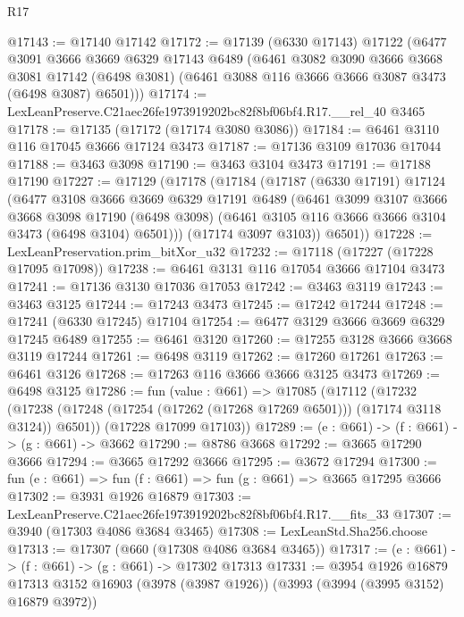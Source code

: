 \begin{lexlean}{R17}
\begin{coremodule}
@17143 := @17140 @17142
@17172 := @17139
    (@6330 @17143)
    @17122
    (@6477
      @3091
      @3666
      @3669
      @6329
      @17143
      @6489
      (@6461
        @3082
        @3090
        @3666
        @3668
        @3081
        @17142
        (@6498 @3081)
        (@6461 @3088 @116 @3666 @3666 @3087 @3473 (@6498 @3087) @6501)))
@17174 := LexLeanPreserve.C21aec26fe1973919202bc82f8bf06bf4.R17.__rel_40 @3465
@17178 := @17135 (@17172 (@17174 @3080 @3086))
@17184 := @6461 @3110 @116 @17045 @3666 @17124 @3473
@17187 := @17136 @3109 @17036 @17044
@17188 := @3463 @3098
@17190 := @3463 @3104 @3473
@17191 := @17188 @17190
@17227 := @17129
    (@17178
      (@17184
        (@17187
          (@6330 @17191)
          @17124
          (@6477
            @3108
            @3666
            @3669
            @6329
            @17191
            @6489
            (@6461
              @3099
              @3107
              @3666
              @3668
              @3098
              @17190
              (@6498 @3098)
              (@6461 @3105 @116 @3666 @3666 @3104 @3473 (@6498 @3104) @6501)))
          (@17174 @3097 @3103))
        @6501))
@17228 := LexLeanPreservation.prim_bitXor_u32
@17232 := @17118 (@17227 (@17228 @17095 @17098))
@17238 := @6461 @3131 @116 @17054 @3666 @17104 @3473
@17241 := @17136 @3130 @17036 @17053
@17242 := @3463 @3119
@17243 := @3463 @3125
@17244 := @17243 @3473
@17245 := @17242 @17244
@17248 := @17241 (@6330 @17245) @17104
@17254 := @6477 @3129 @3666 @3669 @6329 @17245 @6489
@17255 := @6461 @3120
@17260 := @17255 @3128 @3666 @3668 @3119 @17244
@17261 := @6498 @3119
@17262 := @17260 @17261
@17263 := @6461 @3126
@17268 := @17263 @116 @3666 @3666 @3125 @3473
@17269 := @6498 @3125
@17286 := fun (value : @661) =>
  @17085
    (@17112
      (@17232 (@17238 (@17248 (@17254 (@17262 (@17268 @17269 @6501))) (@17174 @3118 @3124)) @6501))
      (@17228 @17099 @17103))
@17289 := (e : @661) -> (f : @661) -> (g : @661) -> @3662
@17290 := @8786 @3668
@17292 := @3665 @17290 @3666
@17294 := @3665 @17292 @3666
@17295 := @3672 @17294
@17300 := fun (e : @661) => fun (f : @661) => fun (g : @661) => @3665 @17295 @3666
@17302 := @3931 @1926 @16879
@17303 := LexLeanPreserve.C21aec26fe1973919202bc82f8bf06bf4.R17.__fits_33
@17307 := @3940 (@17303 @4086 @3684 @3465)
@17308 := LexLeanStd.Sha256.choose
@17313 := @17307 (@660 (@17308 @4086 @3684 @3465))
@17317 := (e : @661) -> (f : @661) -> (g : @661) -> @17302 @17313
@17331 := @3954
    @1926
    @16879
    @17313
    @3152
    @16903
    (@3978 (@3987 @1926))
    (@3993 (@3994 (@3995 @3152) @16879 @3972))

\end{coremodule}
\end{lexlean}
